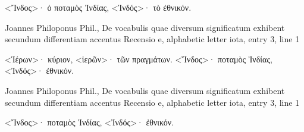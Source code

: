 \documentclass[12pt,letterpaper,twoside,final]{memoir}
\begin{document}
\begin{greek}
<Ἴνδος>· ὁ ποταμὸς Ἰνδίας, 
<Ἰνδός>· τὸ ἐθνικόν. 



Joannes Philoponus Phil., De vocabulis quae diversum significatum exhibent secundum differentiam accentus 
Recensio e, alphabetic letter iota, entry 3, line 1

<Ἱέρων>· κύριον, 
<ἱερῶν>· τῶν πραγμάτων. 
<Ἴνδος>· ποταμὸς Ἰνδίας, 
<Ἰνδός>· ἐθνικόν. 



Joannes Philoponus Phil., De vocabulis quae diversum significatum exhibent secundum differentiam accentus 
Recensio e, alphabetic letter iota, entry 3, line 1

<Ἴνδος>· ποταμὸς Ἰνδίας, 
<Ἰνδός>· ἐθνικόν. 

\end{greek}
\end{document}
